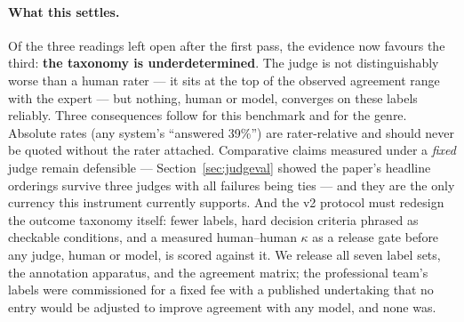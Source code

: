 \paragraph{What this settles.} Of the three readings left open after
the first pass, the evidence now favours the third: \textbf{the
taxonomy is underdetermined}. The judge is not distinguishably worse
than a human rater --- it sits at the top of the observed agreement
range with the expert --- but nothing, human or model, converges on
these labels reliably. Three consequences follow for this benchmark
and for the genre. Absolute rates (any system's ``answered 39\%'')
are rater-relative and should never be quoted without the rater
attached. Comparative claims measured under a \emph{fixed} judge
remain defensible --- Section~\ref{sec:judgeval} showed the paper's
headline orderings survive three judges with all failures being ties
--- and they are the only currency this instrument currently supports.
And the v2 protocol must redesign the outcome taxonomy itself:
fewer labels, hard decision criteria phrased as checkable conditions,
and a measured human--human $\kappa$ as a release gate before any
judge, human or model, is scored against it. We release all seven
label sets, the annotation apparatus, and the agreement matrix; the
professional team's labels were commissioned for a fixed fee with a
published undertaking that no entry would be adjusted to improve
agreement with any model, and none was.
